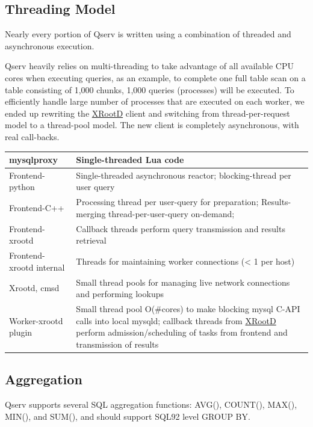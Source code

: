 \documentclass[DM,lsstdraft,toc]{lsstdoc}
\begin{document}
\subsection{Threading Model}\label{threading-model}

Nearly every portion of Qserv is written using a combination of threaded
and asynchronous execution.

Qserv heavily relies on multi-threading to take advantage of all
available CPU cores when executing queries, as an example, to complete
one full table scan on a table consisting of 1,000 chunks, 1,000 queries
(processes) will be executed. To efficiently handle large number of
processes that are executed on each worker, we ended up rewriting the
\href{http://xrootd.org}{XRootD} client and switching from
thread-per-request model to a thread-pool model. The new client is
completely asynchronous, with real call-backs.

\begin{longtable}{|l|p{}|}
\hline
mysqlproxy & Single-threaded Lua code \\ \hline
Frontend-python & Single-threaded asynchronous reactor; blocking-thread per user
query \\ \hline
Frontend-C++ & Processing thread per user-query for preparation; Results-merging
thread-per-user-query on-demand; \\ \hline
Frontend-xrootd &
Callback threads perform query transmission and results retrieval \\ \hline
Frontend-xrootd internal &
Threads for maintaining worker connections (\textless{} 1 per
host) \\ \hline
Xrootd, cmsd &
Small thread pools for managing live network connections and performing
lookups \\ \hline
Worker-xrootd plugin &
Small thread pool O(\#cores) to make blocking mysql C-API calls into
local mysqld; callback threads from \href{http://xrootd.org}{XRootD}
perform admission/scheduling of tasks from frontend and transmission of
results \\ \hline
\hline
\end{longtable}

\subsection{Aggregation}\label{aggregation}

Qserv supports several SQL aggregation functions: AVG(), COUNT(), MAX(),
MIN(), and SUM(), and should support SQL92 level GROUP BY.
\end{document}
